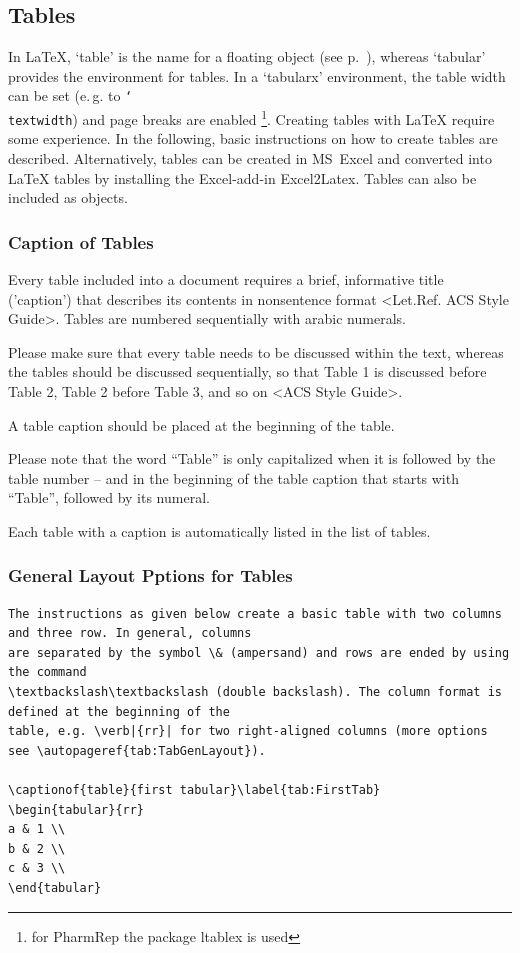 \documentclass{pharmrep}
\newcommand{\PharmRep}{\textsf{PharmRep}\xspace}
\DeclareRobustCommand\cs[1]{\texttt{\char`\\#1}}
\newcommand{\pkg}[1]{\textsf{#1}}
\newcommand{\eg}{e.\,g.\xspace}
\begin{document}
\subsection{Tables}
In \LaTeX{}, `table' is the name for a floating object (see p.~\pageref{subsubsec:TableFloating}), whereas
`tabular' provides the environment for tables. In a `tabularx' environment, the table width can be set (\eg
to \cs{textwidth}) and page breaks are enabled \footnote{for \PharmRep the package \pkg{ltablex} is used}.
Creating tables with \LaTeX{} require some experience. In the following, basic instructions on how to create
tables are described. Alternatively, tables can be created in MS~Excel and converted into \LaTeX{} tables by
installing the Excel-add-in Excel2Latex. Tables can also be included as objects.

\subsubsection{Caption of Tables}
Every table included into a document requires a brief, informative title ('caption') that describes its
contents in nonsentence format <Let.Ref. ACS Style Guide>.  Tables are numbered sequentially with
arabic numerals.

Please make sure that every table needs to be discussed within the text, whereas the tables should be
discussed sequentially, so that Table 1 is discussed before Table 2, Table 2 before Table 3, and so on
<ACS Style Guide>.

A table caption should be placed at the beginning of the table.

Please note that the word ``Table'' is only capitalized when it is followed by the table number -- and in the
beginning of the table caption that starts with ``Table'', followed by its numeral.

Each table with a caption is automatically listed in the list of tables.

\subsubsection{General Layout Pptions for Tables}
\begin{verbatim}
The instructions as given below create a basic table with two columns and three row. In general, columns
are separated by the symbol \& (ampersand) and rows are ended by using the command
\textbackslash\textbackslash (double backslash). The column format is defined at the beginning of the
table, e.g. \verb|{rr}| for two right-aligned columns (more options see \autopageref{tab:TabGenLayout}).

\captionof{table}{first tabular}\label{tab:FirstTab}
\begin{tabular}{rr}
a & 1 \\
b & 2 \\
c & 3 \\
\end{tabular}
\end{verbatim}
\end{document}
